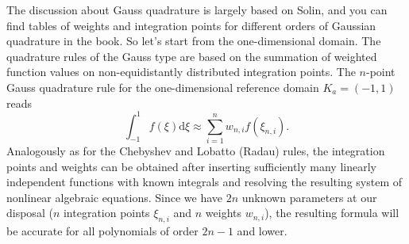 \documentclass{develop-note}
\begin{document}
The discussion about Gauss quadrature is largely based on Solin\cite{solinHigherOrderFiniteElement2003}, and you can find tables of weights and integration points for different orders of Gaussian quadrature in the book. So let's start from the one-dimensional domain. The quadrature rules of the Gauss type are based on the summation of weighted function values on non-equidistantly distributed integration points. The $n$-point Gauss quadrature rule for the one-dimensional reference domain $K_{a}=(-1,1)$ reads
\begin{equation}
  \int_{-1}^{1}f(\xi)\mathrm{d}\xi\approx\sum_{i=1}^{n}w_{n,i}f(\xi_{n,i}).
\end{equation}
Analogously as for the Chebyshev and Lobatto (Radau) rules, the integration points and weights can be obtained after inserting sufficiently many linearly independent functions with known integrals and resolving the resulting system of nonlinear algebraic equations. Since we have $2n$ unknown parameters at our disposal ($n$ integration points $\xi_{n,i}$ and $n$ weights $w_{n,i}$), the resulting formula will be accurate for all polynomials of order $2n-1$ and lower.
\end{document}
